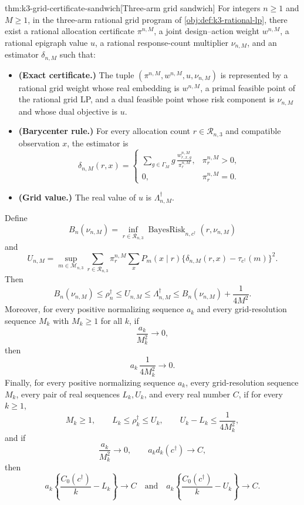 \documentclass[11pt]{article}
\begin{document}
\begin{theoremv}{thm:k3-grid-certificate-sandwich}[Three-arm grid sandwich]
For integers \(n\ge 1\) and \(M\ge 1\), in the three-arm rational grid program of \cref{obj:def:k3-rational-lp}, there exist a rational allocation certificate \(\pi^{n,M}\), a joint design--action weight \(w^{n,M}\), a rational epigraph value \(u\), a rational response-count multiplier \(\nu_{n,M}\), and an estimator \(\delta_{n,M}\) such that:
\begin{itemize}
\item \textbf{(Exact certificate.)} The tuple \((\pi^{n,M},w^{n,M},u,\nu_{n,M})\) is represented by a rational grid weight whose real embedding is \(w^{n,M}\), a primal feasible point of the rational grid LP, and a dual feasible point whose risk component is \(\nu_{n,M}\) and whose dual objective is \(u\).
\item \textbf{(Barycenter rule.)} For every allocation count \(r\in\mathcal R_{n,3}\) and compatible observation \(x\), the estimator is
\[
\delta_{n,M}(r,x)
=
\begin{cases}
\displaystyle
\sum_{g\in\Gamma_M} g\,\frac{w_{r,x,g}^{n,M}}{\pi_r^{n,M}},
& \pi_r^{n,M}>0,\\[1ex]
0, & \pi_r^{n,M}=0.
\end{cases}
\]
\item \textbf{(Grid value.)} The real value of \(u\) is \(\Lambda_{n,M}^\dagger\).
\end{itemize}
Define
\[
B_n(\nu_{n,M})
=
\inf_{r\in\mathcal R_{n,3}}
\operatorname{BayesRisk}_{n,c^\dagger}(r,\nu_{n,M})
\]
and
\[
U_{n,M}
=
\sup_{m\in\mathcal M_{n,3}}
\sum_{r\in\mathcal R_{n,3}}\pi_r^{n,M}
\sum_x
P_m(x\mid r)
\{\delta_{n,M}(r,x)-\tau_{c^\dagger}(m)\}^2 .
\]
Then
\[
B_n(\nu_{n,M})
\le
\rho_n^\dagger
\le
U_{n,M}
\le
\Lambda_{n,M}^\dagger
\le
B_n(\nu_{n,M})+\frac{1}{4M^2}.
\]
Moreover, for every positive normalizing sequence \(a_k\) and every grid-resolution sequence \(M_k\) with \(M_k\ge 1\) for all \(k\), if
\[
\frac{a_k}{M_k^2}\longrightarrow 0,
\]
then
\[
a_k\,\frac{1}{4M_k^2}\longrightarrow 0.
\]
Finally, for every positive normalizing sequence \(a_k\), every grid-resolution sequence \(M_k\), every pair of real sequences \(L_k,U_k\), and every real number \(C\), if for every \(k\ge 1\),
\[
M_k\ge 1,\qquad
L_k\le \rho_k^\dagger\le U_k,\qquad
U_k-L_k\le \frac{1}{4M_k^2},
\]
and if
\[
\frac{a_k}{M_k^2}\longrightarrow 0,
\qquad
a_k d_k(c^\dagger)\longrightarrow C,
\]
then
\[
a_k\left\{\frac{C_0(c^\dagger)}{k}-L_k\right\}\longrightarrow C
\quad\text{and}\quad
a_k\left\{\frac{C_0(c^\dagger)}{k}-U_k\right\}\longrightarrow C .
\]
\end{theoremv}
\end{document}
